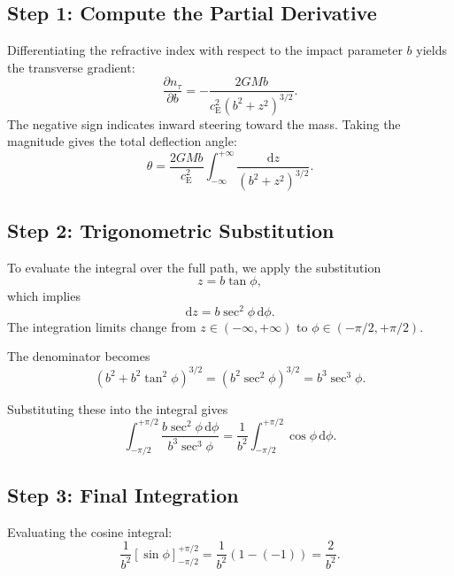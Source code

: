 \subsection{Step 1: Compute the Partial Derivative}
Differentiating the refractive index with respect to the impact parameter $b$ yields the transverse gradient:
\begin{equation}
    \frac{\partial n_\tau}{\partial b} = -\frac{2GMb}{c_{\mathrm{E}}^2(b^2+z^2)^{3/2}}.
\end{equation}
The negative sign indicates inward steering toward the mass. Taking the magnitude gives the total deflection angle:
\begin{equation}
    \theta = \frac{2GMb}{c_{\mathrm{E}}^2} \int_{-\infty}^{+\infty} \frac{\mathrm{d}z}{(b^2+z^2)^{3/2}}.
\end{equation}

\subsection{Step 2: Trigonometric Substitution}
To evaluate the integral over the full path, we apply the substitution
\begin{equation}
    z = b\tan\phi,
\end{equation}
which implies
\begin{equation}
    \mathrm{d}z = b\sec^2\phi\,\mathrm{d}\phi.
\end{equation}
The integration limits change from $z \in (-\infty, +\infty)$ to $\phi \in (-\pi/2, +\pi/2)$.

The denominator becomes
\begin{equation}
    (b^2+b^2\tan^2\phi)^{3/2} = (b^2\sec^2\phi)^{3/2} = b^3\sec^3\phi.
\end{equation}

Substituting these into the integral gives
\begin{equation}
    \int_{-\pi/2}^{+\pi/2} \frac{b\sec^2\phi\,\mathrm{d}\phi}{b^3\sec^3\phi} = \frac{1}{b^2} \int_{-\pi/2}^{+\pi/2} \cos\phi\,\mathrm{d}\phi.
\end{equation}

\subsection{Step 3: Final Integration}
Evaluating the cosine integral:
\begin{equation}
    \frac{1}{b^2} \left[ \sin\phi \right]_{-\pi/2}^{+\pi/2} = \frac{1}{b^2} \left( 1-(-1) \right) = \frac{2}{b^2}.
\end{equation}


